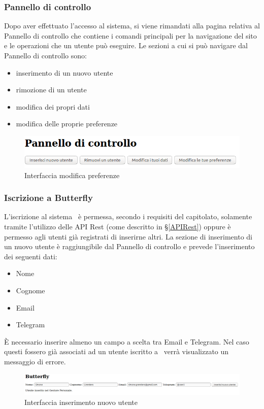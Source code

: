 \subsubsection{Pannello di controllo}
Dopo aver effettuato l'accesso al sistema, si viene rimandati alla pagina relativa al Pannello di controllo che contiene i comandi principali per la navigazione del sito e le operazioni che un utente può eseguire.
Le sezioni a cui si può navigare dal Pannello di controllo sono:
\begin{itemize}
	\item inserimento di un nuovo utente
	\item rimozione di un utente
	\item modifica dei propri dati
	\item modifica delle proprie preferenze
\end{itemize}
\begin{figure}[H]
	\centering
	\includegraphics[width=14cm]{img/pannello_1.png}
	\caption{Interfaccia modifica preferenze}
\end{figure}

\subsubsection{Iscrizione a Butterfly}
L'iscrizione al sistema \progetto\ è permessa, secondo i requisiti del capitolato, solamente tramite l'utilizzo delle API Rest (come descritto in \S\ref{APIRest}) oppure è permesso agli utenti già registrati di inserirne altri.
La sezione di inserimento di un nuovo utente è raggiungibile dal Pannello di controllo e prevede l'inserimento dei seguenti dati:
\begin{itemize}
	\item Nome
	\item Cognome
	\item Email
	\item Telegram
\end{itemize}
È necessario inserire almeno un campo a scelta tra Email e Telegram.
Nel caso questi fossero già associati ad un utente iscritto a \progetto\ verrà visualizzato un messaggio di errore.
\begin{figure}[H]
	\centering
	\includegraphics[width=\textwidth]{img/inserimento_1.png}
	\caption{Interfaccia inserimento nuovo utente}
\end{figure}

